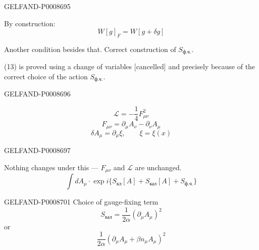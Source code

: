\begin{GelfandAdjacentEvidence}{GELFAND-P000869}{5}


By construction:
\begin{equation*}
W[g]_F=W[g+\delta g]
\tag{21}
\end{equation*}

Another condition besides that. Correct construction of $S_{\text{ф.ч.}}$.

(13) is proved using a change of variables [cancelled] and precisely because of the correct choice of the action $S_{\text{ф.ч.}}$.
\end{GelfandAdjacentEvidence}
\begin{GelfandAdjacentEvidence}{GELFAND-P000869}{6}


\begin{equation*}
\mathcal L=-\frac14F_{\mu\nu}^2
\tag{22}
\end{equation*}
\begin{equation*}
F_{\mu\nu}=\partial_\mu A_\nu-\partial_\nu A_\mu
\tag{23}
\end{equation*}
\begin{equation*}
\delta A_\mu=\partial_\mu\xi,\qquad \xi=\xi(x)
\tag{24}
\end{equation*}
\end{GelfandAdjacentEvidence}
\begin{GelfandAdjacentEvidence}{GELFAND-P000869}{7}

\end{GelfandAdjacentEvidence}


Nothing changes under this --- $F_{\mu\nu}$ and $\mathcal L$ are unchanged.
\begin{equation*}
\int dA_\mu\cdot\exp i\{S_{\text{кл}}[A]+S_{\text{кал}}[A]+S_{\text{ф.ч.}}\}
\tag{25}
\end{equation*}


\begin{GelfandAdjacentEvidence}{GELFAND-P000870}{1}
Choice of gauge-fixing term
\begin{equation*}
S_{\text{кал}}=\frac1{2\alpha}(\partial_\mu A_\mu)^2
\tag{26}
\end{equation*}
or
\begin{equation*}
\frac1{2\alpha}(\partial_\mu A_\mu+\beta n_\mu A_\mu)^2
\tag{27}
\end{equation*}
\end{GelfandAdjacentEvidence}


